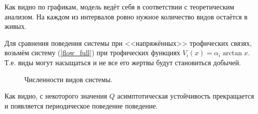 Как видно по графикам, модель ведёт себя в соответствии с теоретическим анализом. На каждом из интервалов ровно нужное количество видов остаётся в живых. 

Для сравнения поведения системы при <<напряжённых>> трофических связях, возьмём систему (\ref{flow_full}) при трофических функциях \( V_i(x) = \alpha_i \arctan x \). Т.е. виды могут насыщаться и не все его жертвы будут становиться добычей.


\begin{figure}[H]
    \centering
\caption{Численности видов системы.}  \label{fig:flow_exp2}
\end{figure}

Как видно, с некоторого значения \(Q\) асимптотическая устойчивость прекращается и появляется периодическое поведение поведение.